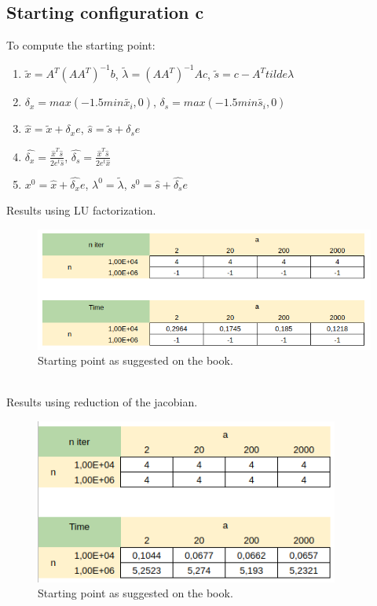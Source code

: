 \documentclass[]{article}
\begin{document}
\subsection{Starting configuration c}
To compute the starting point:
\begin{enumerate}
	\item $\tilde{x} = A^T(AA^T)^{-1}b$, $\tilde{\lambda} = (AA^T)^{-1}Ac$, $\tilde{s} = c-A^Ttilde{\lambda}$
	\item $\delta_x=max(-1.5min\tilde{x_i},0)$, $\delta_s=max(-1.5min\tilde{s_i},0)$
	\item $\hat{x} = \tilde{x} + \delta_xe$, $\hat{s} = \tilde{s} + \delta_se$
	\item $\hat{\delta_x}=\frac{\hat{x}^T\hat{s}}{2e^t\hat{s}}$, $\hat{\delta_s}=\frac{\hat{x}^T\hat{s}}{2e^t\hat{x}}$
	\item $x^0 = \hat{x} + \hat{\delta_x}e$, $\lambda^0=\tilde{\lambda}$, $s^0 = \hat{s} + \hat{\delta_s}e$
\end{enumerate}
Results using LU factorization.\\
\begin{figure}[h]
	\includegraphics[width=12cm]{table4.png}
	\caption{Starting point as suggested on the book.}
\end{figure}\\
Results using reduction of the jacobian.
\begin{figure}[h]
	\includegraphics[width=10cm]{table1.png}
	\caption{Starting point as suggested on the book.}
\end{figure}
\pagebreak
\end{document}
